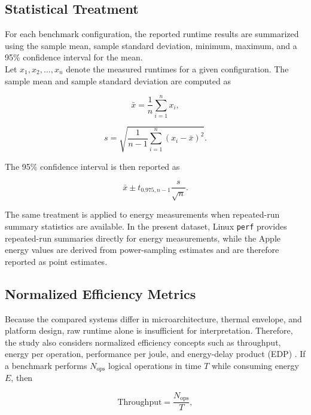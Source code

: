 \documentclass{tcsa}
\begin{document}
\subsection{Statistical Treatment}

For each benchmark configuration, the reported runtime results are summarized
using the sample mean, sample standard deviation, minimum, maximum, and a 95\%
confidence interval for the mean. \\ Let $x_1, x_2, \dots, x_n$ denote the
measured runtimes for a given configuration. The sample mean and sample
standard deviation are computed as

\begin{equation}
\bar{x} = \frac{1}{n}\sum_{i=1}^{n} x_i,
\end{equation}

\begin{equation}
s = \sqrt{\frac{1}{n-1}\sum_{i=1}^{n}(x_i-\bar{x})^2}.
\end{equation}

The 95\% confidence interval is then reported as

\begin{equation}
\bar{x} \pm t_{0.975,n-1}\frac{s}{\sqrt{n}}.
\end{equation}

The same treatment is applied to energy measurements when repeated-run summary
statistics are available. In the present dataset, Linux \texttt{perf} provides
repeated-run summaries directly for energy measurements, while the Apple energy
values are derived from power-sampling estimates and are therefore reported as
point estimates.

\subsection{Normalized Efficiency Metrics}

Because the compared systems differ in microarchitecture, thermal envelope, and
platform design, raw runtime alone is insufficient for interpretation.
Therefore, the study also considers normalized efficiency concepts such as
throughput, energy per operation, performance per joule, and energy-delay
product (EDP) \cite{hennessy_patterson_2019}. If a benchmark performs $N_{\mathrm{ops}}$ logical operations in
time $T$ while consuming energy $E$, then

\begin{equation}
\mathrm{Throughput} = \frac{N_{\mathrm{ops}}}{T},
\end{equation}
\end{document}
